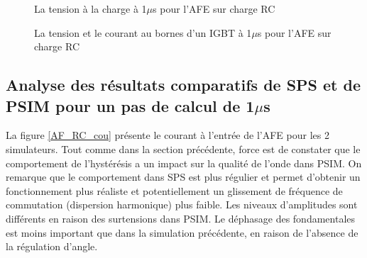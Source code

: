 \begin{figure}[htb]
\caption{La tension à la charge à 1$\mu$s pour l'AFE sur charge RC}
\label{AF_RC_ten}
\end{figure}



\begin{figure}[htb]
\caption{La tension et le courant au bornes d'un IGBT à 1$\mu$s pour l'AFE sur charge RC}
\label{AF_RC_igbt}
\end{figure}

\clearpage

\subsection{Analyse des résultats comparatifs de SPS et de PSIM pour un pas de calcul de 1$\mu$s}

La figure \ref{AF_RC_cou} présente le courant à l'entrée de l'AFE pour les 2 simulateurs. Tout comme dans la section précédente, force est de constater que le comportement de l'hystérésis a un impact sur la qualité de l'onde dans PSIM. On remarque que le comportement dans SPS est plus régulier et permet d'obtenir un fonctionnement plus réaliste et potentiellement un glissement de fréquence de commutation (dispersion harmonique) plus faible. Les niveaux d'amplitudes sont différents en raison des surtensions dans PSIM. Le déphasage des fondamentales est moins important que dans la simulation précédente, en raison de l'absence de la régulation d'angle. 

